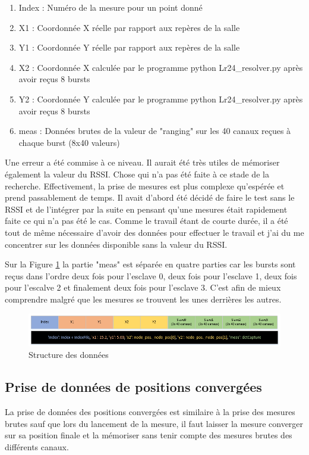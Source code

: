 \begin{enumerate}
	\item Index : Numéro de la mesure pour un point donné
	\item X1 : Coordonnée X réelle par rapport aux repères de la salle 
	\item Y1 : Coordonnée Y réelle par rapport aux repères de la salle 
	\item X2 : Coordonnée X calculée par le programme python Lr24\_resolver.py après avoir reçus 8 bursts
	\item Y2 : Coordonnée Y calculée par le programme python Lr24\_resolver.py après avoir reçus 8 bursts
	\item meas : Données brutes de la valeur de "ranging" sur les 40 canaux reçues à chaque burst (8x40 valeurs)
\end{enumerate}

Une erreur a été commise à ce niveau. Il aurait été très utiles de mémoriser également la valeur du RSSI. Chose qui n'a pas été faite à ce stade de la recherche. Effectivement, la prise de mesures est plus complexe qu'espérée et prend passablement de temps. Il avait d'abord été décidé de faire le test sans le RSSI et de l'intégrer par la suite en pensant qu'une mesures était rapidement faite ce qui n'a pas été le cas. Comme le travail étant de courte durée, il a été tout de même nécessaire d'avoir des données pour effectuer le travail et j'ai du me concentrer sur les données disponible sans la valeur du RSSI. 

Sur la Figure \ref{fig:dataStruct} la partie "meas" est séparée en quatre parties car les bursts sont reçus dans l'ordre deux fois pour l'esclave 0, deux fois pour l'esclave 1, deux fois pour l'escalve 2 et finalement deux fois pour l'esclave 3. C'est afin de mieux comprendre malgré que les mesures se trouvent les unes derrières les autres.

\begin{figure}[htp]
	\begin{center}
		\includegraphics[scale=0.7]{figures/dataStruct.png}
		\caption{Structure des données}
		\label{fig:dataStruct} %
	\end{center}
\end{figure}

\subsection{Prise de données de positions convergées}
La prise de données des positions convergées est similaire à la prise des mesures brutes sauf que lors du lancement de la mesure, il faut laisser la mesure converger sur sa position finale et la mémoriser sans tenir compte des mesures brutes des différents canaux.

